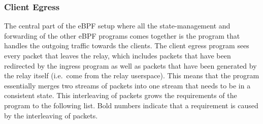 \subsubsection{Client Egress}
The central part of the eBPF setup where all the state-management and forwarding of the other 
eBPF programs comes together is the program that handles the outgoing traffic towards the clients.
The client egress program sees every packet that leaves the relay, which includes packets that have 
been redirected by the ingress program as well as packets that have been generated by the relay itself
(i.e.~come from the relay userspace).
This means that the program essentially merges two streams of packets into one stream that needs to 
be in a consistent state.
This interleaving of packets grows the requirements of the program to the following list.
Bold numbers indicate that a requirement is caused by the interleaving of packets.

